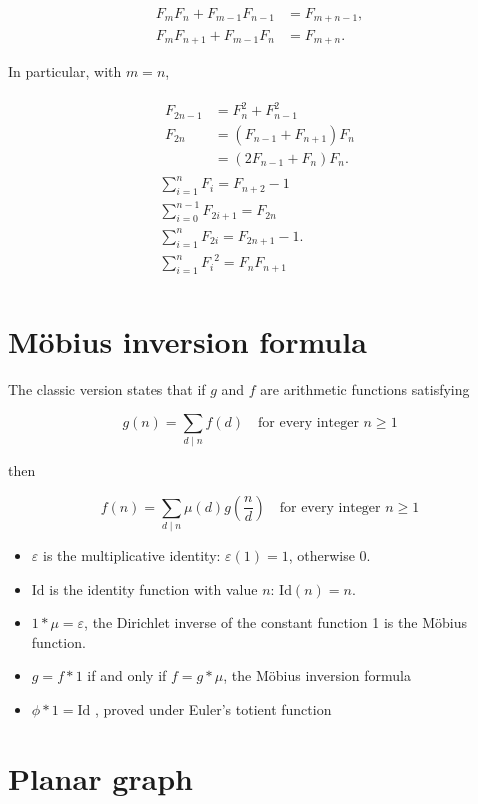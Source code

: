 \documentclass[11pt]{article}
\begin{document}
\begin{multicols}{3}
$$\begin{aligned}
{F_{m}}{F_{n}}+{F_{m-1}}{F_{n-1}}&=F_{m+n-1},\\
F_{m}F_{n+1}+F_{m-1}F_{n}&=F_{m+n}.
\end{aligned}$$

In particular, with $m = n$,

\begin{align*}
    \begin{aligned}F_{2n-1}&=F_{n}^{2}+F_{n-1}^{2}\\F_{2n}&=(F_{n-1}+F_{n+1})F_{n}\\&=(2F_{n-1}+F_{n})F_{n}.\end{aligned}\\
\sum _{i=1}^{n}F_{i}=F_{n+2}-1\\
\sum _{i=0}^{n-1}F_{2i+1}=F_{2n}\\
\sum _{i=1}^{n}F_{2i}=F_{2n+1}-1.\\
\sum _{i=1}^{n}{F_{i}}^{2}=F_{n}F_{n+1}\\
\end{align*}

\section{Möbius inversion formula}
The classic version states that if $g$ and $f$ are arithmetic functions satisfying

$$ g(n)=\sum _{d\mid n}f(d)\quad {\text{for every integer }}n\geq 1$$

then

$$ f(n)=\sum _{d\mid n}\mu (d)g\left({\frac {n}{d}}\right)\quad {\text{for every integer }}n\geq 1$$

\begin{itemize}
    \item $\varepsilon$  is the multiplicative identity: $ \varepsilon (1)=1$, otherwise 0.
    \item ${\text{Id}}$ is the identity function with value $n$: $ {\text{Id}}(n)=n$.
    \item $ 1*\mu =\varepsilon $, the Dirichlet inverse of the constant function 1 is the Möbius function.
    \item $g=f*1$ if and only if $f=g*\mu$, the Möbius inversion formula
    \item$ \phi *1={\text{Id}}$ , proved under Euler's totient function
\end{itemize}

\section{Planar graph}


\end{multicols}
\end{document}

